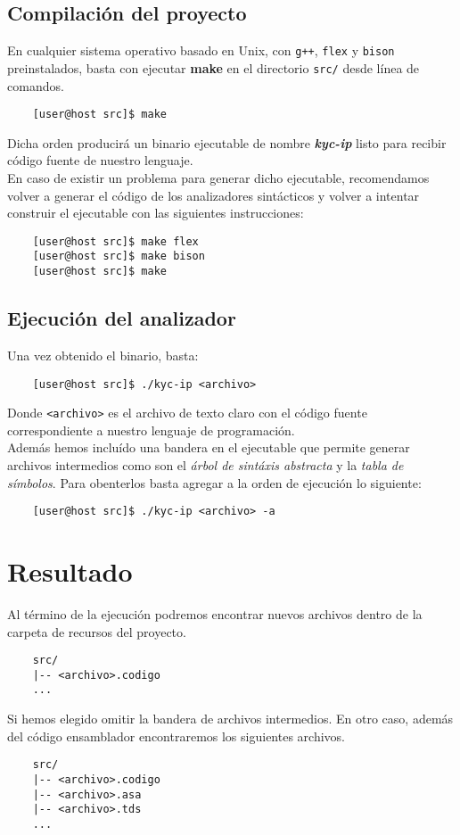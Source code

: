 \documentclass[12pt]{article}
\begin{document}
\subsection{Compilación del proyecto}

En cualquier sistema operativo basado en Unix, con \texttt{g++}, \texttt{flex} y \texttt{bison} preinstalados, basta con ejecutar \textbf{make} en el directorio \texttt{src/} desde línea de comandos.

\begin{verbatim}
    [user@host src]$ make
\end{verbatim}

Dicha orden producirá un binario ejecutable de nombre \textit{\textbf{kyc-ip}} listo para recibir código fuente de nuestro lenguaje.\\

En caso de existir un problema para generar dicho ejecutable, recomendamos volver a generar el código de los analizadores sintácticos y volver a intentar construir el ejecutable con las siguientes instrucciones:

\begin{verbatim}
    [user@host src]$ make flex
    [user@host src]$ make bison
    [user@host src]$ make
\end{verbatim}


\subsection{Ejecución del analizador} 

Una vez obtenido el binario, basta:
\begin{verbatim}
    [user@host src]$ ./kyc-ip <archivo>
\end{verbatim}
Donde \texttt{<archivo>} es el archivo de texto claro con el código fuente correspondiente a nuestro lenguaje de programación.\\

Además hemos incluído una bandera en el ejecutable que permite generar archivos intermedios
como son el \textit{árbol de sintáxis abstracta} y la \textit{tabla de símbolos}. Para obenterlos
basta agregar a la orden de ejecución lo siguiente:
\begin{verbatim}
    [user@host src]$ ./kyc-ip <archivo> -a
\end{verbatim}
\newpage
\section{Resultado}
Al término de la ejecución podremos encontrar nuevos archivos dentro de la carpeta de recursos del
proyecto.
\begin{verbatim}
    src/
    |-- <archivo>.codigo
    ...
\end{verbatim}
Si hemos elegido omitir la bandera de archivos intermedios. En otro caso, además del código ensamblador encontraremos los siguientes archivos.
\begin{verbatim}
    src/
    |-- <archivo>.codigo
    |-- <archivo>.asa
    |-- <archivo>.tds
    ...
\end{verbatim}
\end{document}
